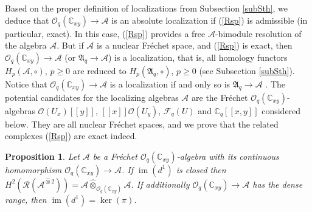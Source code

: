 \documentclass[12pt,reqno]{amsart}%
\theoremstyle{plain}
\newtheorem{proposition}{Proposition}
\numberwithin{theorem}{section} \numberwithin{equation}{section}
\numberwithin{lemma}{section}
\numberwithin{remark}{section}
\numberwithin{example}{section}
\numberwithin{proposition}{section}
\numberwithin{definition}{section}
\numberwithin{corollary}{section}
\begin{document}
Based on the proper definition of localizations from Subsection \ref{subSth},
we deduce that $\mathcal{O}_{q}\left(  \mathbb{C}_{xy}\right)  \rightarrow
\mathcal{A}$ is an absolute localization if (\ref{Rsp}) is admissible (in
particular, exact). In this case, (\ref{Rsp}) provides a free $\mathcal{A}%
$-bimodule resolution of the algebra $\mathcal{A}$. But if $\mathcal{A}$ is a
nuclear Fr\'{e}chet space, and (\ref{Rsp}) is exact, then $\mathcal{O}%
_{q}\left(  \mathbb{C}_{xy}\right)  \rightarrow\mathcal{A}$ (or $\mathfrak{A}%
_{q}\rightarrow\mathcal{A}$) is a localization, that is, all homology functors
$H_{p}\left(  \mathcal{A},\circ\right)  $, $p\geq0$ are reduced to
$H_{p}\left(  \mathfrak{A}_{q},\circ\right)  $, $p\geq0$ (see Subsection
\ref{subSth}). Notice that $\mathcal{O}_{q}\left(  \mathbb{C}_{xy}\right)
\rightarrow\mathcal{A}$ is a localization if and only so is $\mathfrak{A}%
_{q}\rightarrow\mathcal{A}$ \cite[Proposition 1.8]{Tay2}. The potential
candidates for the localizing algebras $\mathcal{A}$ are the Fr\'{e}chet
$\mathcal{O}_{q}\left(  \mathbb{C}_{xy}\right)  $-algebras $\mathcal{O}\left(
U_{x}\right)  \left[  \left[  y\right]  \right]  $, $\left[  \left[  x\right]
\right]  \mathcal{O}\left(  U_{y}\right)  $, $\mathcal{F}_{q}\left(  U\right)
$ and $\mathbb{C}_{q}\left[  \left[  x,y\right]  \right]  $ considered below.
They are all nuclear Fr\'{e}chet spaces, and we prove that the related
complexes (\ref{Rsp}) are exact indeed.

\begin{proposition}
\label{propKD}Let $\mathcal{A}$ be a Fr\'{e}chet $\mathcal{O}_{q}\left(
\mathbb{C}_{xy}\right)  $-algebra with its continuous homomorphism
$\mathcal{O}_{q}\left(  \mathbb{C}_{xy}\right)  \rightarrow\mathcal{A}$. If
$\operatorname{im}\left(  d^{1}\right)  $ is closed then $H^{2}\left(
\mathcal{R}\left(  \mathcal{A}^{\widehat{\otimes}2}\right)  \right)
=\mathcal{A}\widehat{\otimes}_{\mathcal{O}_{q}\left(  \mathbb{C}_{xy}\right)
}\mathcal{A}$. If additionally $\mathcal{O}_{q}\left(  \mathbb{C}_{xy}\right)
\rightarrow\mathcal{A}$ has the dense range, then $\operatorname{im}\left(
d^{1}\right)  =\ker\left(  \pi\right)  $.
\end{proposition}
\end{document}

